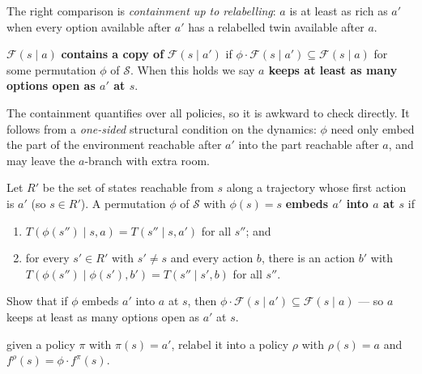 \documentclass[11pt]{article}
\newcommand{\cS}{\mathcal{S}}
\newcommand{\F}{\mathcal{F}}       %
\begin{document}
The right comparison is \emph{containment up to relabelling}: $a$ is at least as rich as $a'$
when every option available after $a'$ has a relabelled twin available after $a$.

\begin{definition}\label{def:keep_options}
$\F(s\mid a)$ \textbf{contains a copy of} $\F(s\mid a')$ if $\phi \cdot \F(s\mid a') \subseteq \F(s\mid a)$
for some permutation $\phi$ of $\cS$. When this holds we say \textbf{$a$ keeps at least as many
options open as $a'$ at $s$}.
\end{definition}


The containment quantifies over all policies, so it is awkward to check directly. It follows from a
\emph{one-sided} structural condition on the dynamics: $\phi$ need only embed the part of the
environment reachable after $a'$ into the part reachable after $a$, and may leave the $a$-branch
with extra room.

\begin{definition}\label{def:dyn_embedding}
Let $R'$ be the set of states reachable from $s$ along a trajectory whose first action is $a'$
(so $s \in R'$). A permutation $\phi$ of $\cS$ with $\phi(s) = s$ \textbf{embeds $a'$ into $a$
at $s$} if
\begin{enumerate}
  \item $T(\phi(s'') \mid s, a) = T(s'' \mid s, a')$ for all $s''$; and
  \item for every $s' \in R'$ with $s' \ne s$ and every action $b$, there is an action
  $b'$ with $T(\phi(s'') \mid \phi(s'), b') = T(s'' \mid s', b)$ for all $s''$.
\end{enumerate}
\end{definition}

\begin{exercise}
\label{prob:embedding_gives_copy} Show that if $\phi$ embeds $a'$ into $a$ at
$s$, then $\phi \cdot \F(s\mid a') \subseteq \F(s\mid a)$ --- so $a$ keeps at least as many
options open as $a'$ at $s$.
\end{exercise}
\begin{hint}
given a policy $\pi$ with $\pi(s)=a'$, relabel it into a policy $\rho$ with
$\rho(s)=a$ and $f^\rho(s) = \phi \cdot f^\pi(s)$.
\end{hint}
\end{document}
